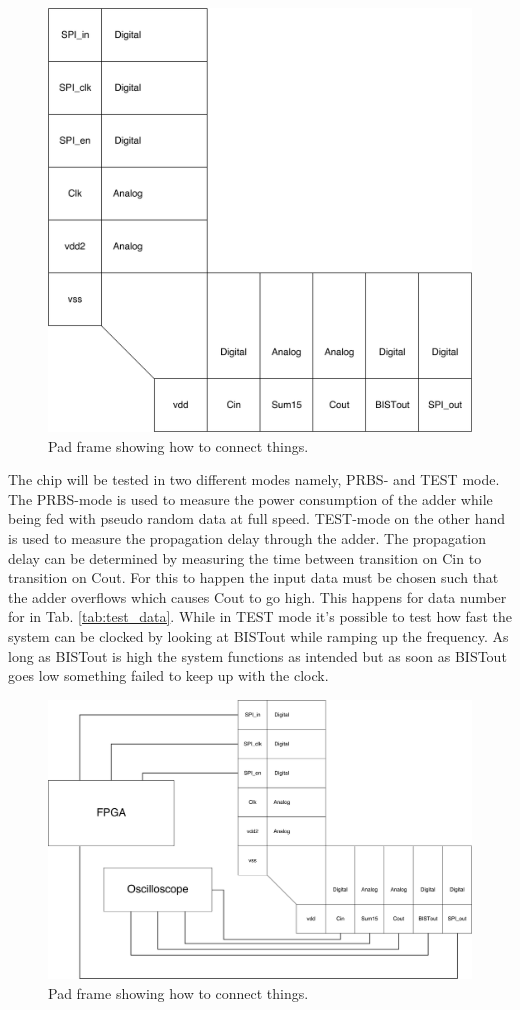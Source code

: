 \begin{figure}[H]
\centering
\captionsetup{justification=centering}
\includegraphics[scale=0.1]{../figures/padframe.png}
\caption{Pad frame showing how to connect things.} \label{fig:padframe}
\end{figure}

The chip will be tested in two different modes namely, PRBS- and TEST mode. The PRBS-mode is used to measure the power consumption of the adder while being fed with pseudo random data at full speed. TEST-mode on the other hand is used to measure the propagation delay through the adder. The propagation delay can be determined by measuring the time between transition on Cin to transition on Cout. For this to happen the input data must be chosen such that the adder overflows which causes Cout to go high. This happens for data number for in Tab. \ref{tab:test_data}. While in TEST mode it's possible to test how fast the system can be clocked by looking at BISTout while ramping up the frequency. As long as BISTout is high the system functions as intended but as soon as BISTout goes low something failed to keep up with the clock.

\begin{figure}[H]
\centering
\captionsetup{justification=centering}
\includegraphics[scale=0.07]{../figures/evaluation_setup.png}
\caption{Pad frame showing how to connect things.} \label{fig:setup}
\end{figure} 